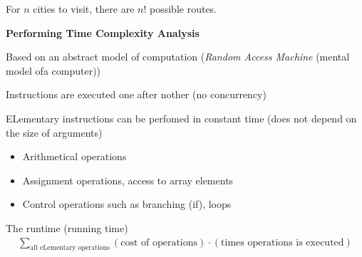 \noindent For $n$ cities to visit, there are $n!$ possible routes.
\par\bigskip
\noindent\textbf{Performing Time Complexity Analysis}\par
\noindent Based on an abstract model of computation (\textit{Random Access Machine} (mental model ofa computer))\par
Instructions are executed one after nother (no concurrency)\par
ELementary instructions can be perfomed in constant time (does not depend on the size of arguments)\par
\begin{itemize}
  \item Arithmetical operations
  \item Assignment operations, access to array elements
  \item Control operations such as branching (if), loops
\end{itemize}
\par\bigskip
\begin{theo}{}
  The runtime (running time)
  \begin{equation*}
    \begin{gathered}
      \sum_{\text{all eLementary operations}}(\text{cost of operations})\cdot(\text{times operations is executed})
    \end{gathered}
  \end{equation*}
\end{theo}
